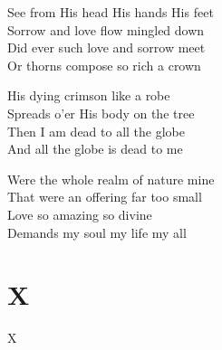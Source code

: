 \documentclass{beamer}
\begin{document}
{\begin{frame}{}
\end{frame}

\hypertarget{When I survey the wondrous cross[](Watts)3}{}
\begin{frame}{}
\fontsize{ 18 }{ 23 }\selectfont

See from His head His hands His feet\\ 
Sorrow and love flow mingled down\\ 
Did ever such love and sorrow meet\\ 
Or thorns compose so rich a crown 

\end{frame}

\hypertarget{When I survey the wondrous cross[](Watts)(4)}{}
\begin{frame}{}
\fontsize{ 18 }{ 23 }\selectfont

His dying crimson like a robe\\ 
Spreads o'er His body on the tree\\ 
Then I am dead to all the globe\\ 
And all the globe is dead to me 

\end{frame}

\hypertarget{When I survey the wondrous cross[](Watts)5}{}
\begin{frame}{}
\fontsize{ 18 }{ 23 }\selectfont

Were the whole realm of nature mine\\ 
That were an offering far too small\\ 
Love so amazing so divine\\ 
Demands my soul my life my all 

\end{frame}

}
\section{X}

\begin{frame}{X}
\begin{columns}

    


    


\end{columns}

\end{frame}
\end{document}
